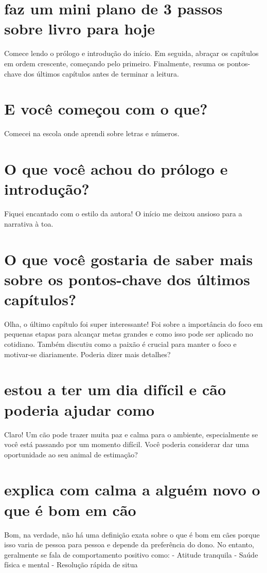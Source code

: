 \documentclass[11pt,a4paper]{article}
\begin{document}
\section{faz um mini plano de 3 passos sobre livro para hoje}
Comece lendo o prólogo e introdução do início. Em seguida, abraçar os capítulos em ordem crescente, começando pelo primeiro. Finalmente, resuma os pontos-chave dos últimos capítulos antes de terminar a leitura.

\section{E você começou com o que?}
Comecei na escola onde aprendi sobre letras e números.

\section{O que você achou do prólogo e introdução?}
Fiquei encantado com o estilo da autora! O início me deixou ansioso para a narrativa à toa.

\section{O que você gostaria de saber mais sobre os pontos-chave dos últimos capítulos?}
Olha, o último capítulo foi super interessante! Foi sobre a importância do foco em pequenas etapas para alcançar metas grandes e como isso pode ser aplicado no cotidiano. Também discutiu como a paixão é crucial para manter o foco e motivar-se diariamente. Poderia dizer mais detalhes?

\section{estou a ter um dia difícil e cão poderia ajudar como}
Claro! Um cão pode trazer muita paz e calma para o ambiente, especialmente se você está passando por um momento difícil. Você poderia considerar dar uma oportunidade ao seu animal de estimação?

\section{explica com calma a alguém novo o que é bom em cão}
Bom, na verdade, não há uma definição exata sobre o que é bom em cães porque isso varia de pessoa para pessoa e depende da preferência do dono. No entanto, geralmente se fala de comportamento positivo como: - Atitude tranquila - Saúde física e mental - Resolução rápida de situa
\end{document}
